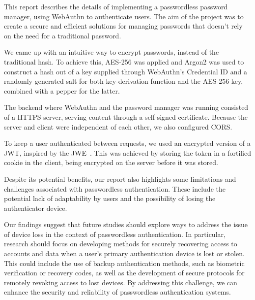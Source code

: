 This report describes the details of implementing a passwordless password
manager, using WebAuthn to authenticate users.
The aim of the project was to create a secure and efficient solutions for
managing passwords that doesn't rely on the need for a traditional password.

We came up with an intuitive way to encrypt passwords, instead of the
traditional hash.
To achieve this, AES-256 was applied and Argon2 was used to construct a hash out
of a key supplied through WebAuthn's Credential ID and a randomly generated
salt for both key-derivation function and the AES-256 key, combined with a
pepper for the latter.

The backend where WebAuthn and the password manager was running consisted of a
HTTPS server, serving content through a self-signed certificate.
Because the server and client were independent of each other, we also
configured CORS\@.

To keep a user authenticated between requests, we used an encrypted version
of a JWT, inspired by the JWE~\cite{rfc7516}\@.
This was achieved by storing the token in a fortified cookie in the client,
being encrypted on the server before it was stored.

Despite its potential benefits, our report also highlights some limitations
and challenges associated with passwordless authentication.
These include the potential lack of adaptability by users and the
possibility of losing the authenticator device.

Our findings suggest that future studies should explore ways to address the
issue of device loss in the context of passwordless authentication.
In particular, research should focus on developing methods for securely
recovering access to accounts and data when a user’s primary authentication
device is lost or stolen.
This could include the use of backup authentication methods, such as biometric
verification or recovery codes, as well as the development of secure protocols
for remotely revoking access to lost devices.
By addressing this challenge, we can enhance the security and reliability of
passwordless authentication systems.
